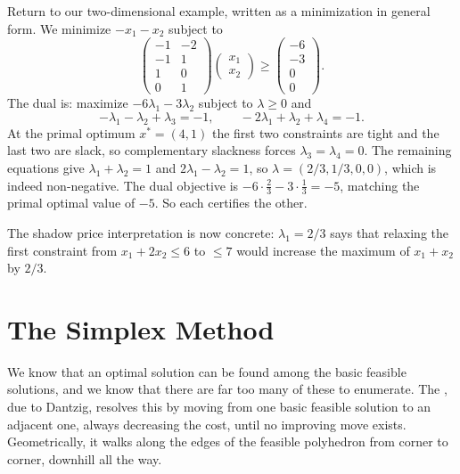 \begin{example}
    Return to our two-dimensional example, written as a minimization in general form. We minimize $-x_1 - x_2$ subject to
    $$
    \begin{pmatrix} -1 & -2 \\ -1 & 1 \\ 1 & 0 \\ 0 & 1\end{pmatrix}\begin{pmatrix}x_1\\x_2\end{pmatrix} \geq \begin{pmatrix}-6\\-3\\0\\0\end{pmatrix}.
    $$
    The dual is: maximize $-6\lambda_1 - 3\lambda_2$ subject to $\lambda \geq 0$ and
    $$
    -\lambda_1 - \lambda_2 + \lambda_3 = -1, \qquad -2\lambda_1 + \lambda_2 + \lambda_4 = -1.
    $$
    At the primal optimum $x^* = (4,1)$ the first two constraints are tight and the last two are slack, so complementary slackness forces $\lambda_3 = \lambda_4 = 0$. The remaining equations give $\lambda_1 + \lambda_2 = 1$ and $2\lambda_1 - \lambda_2 = 1$, so $\lambda = (2/3, 1/3, 0, 0)$, which is indeed non-negative. The dual objective is $-6\cdot\frac23 - 3\cdot\frac13 = -5$, matching the primal optimal value of $-5$. So each certifies the other.

    The shadow price interpretation is now concrete: $\lambda_1 = 2/3$ says that relaxing the first constraint from $x_1 + 2x_2 \leq 6$ to $\leq 7$ would increase the maximum of $x_1 + x_2$ by $2/3$.
\end{example}

\section{The Simplex Method}

We know that an optimal solution can be found among the basic feasible solutions, and we know that there are far too many of these to enumerate. The , due to Dantzig, resolves this by moving from one basic feasible solution to an adjacent one, always decreasing the cost, until no improving move exists. Geometrically, it walks along the edges of the feasible polyhedron from corner to corner, downhill all the way.

